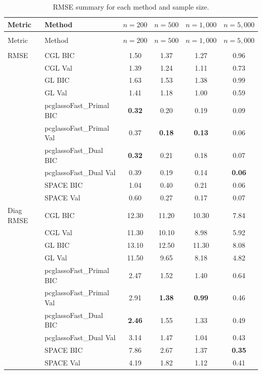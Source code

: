 \documentclass[12pt]{amsart}
\numberwithin{equation}{section}
\numberwithin{equation}{section}
\theoremstyle{plain}
\theoremstyle{definition}
\begin{document}
\begin{longtable}[]{@{}llcccc@{}}
\caption{RMSE summary for each method and sample size.\label{tab:hubrmse}}\\
\toprule\noalign{}
Metric & Method & $n=200$ & $n=500$ & $n=1,000$ & $n=5,000$ \\
\midrule\noalign{}
\endfirsthead

\multicolumn{6}{c}{{\tablename\ \thetable{} -- continued from previous page}} \\
\toprule\noalign{}
Metric & Method & $n=200$ & $n=500$ & $n=1,000$ & $n=5,000$ \\
\midrule\noalign{}
\endhead

\midrule \multicolumn{6}{r}{{Continued on next page}} \\
\endfoot

\bottomrule
\endlastfoot

RMSE & CGL BIC & 1.50 & 1.37 & 1.27 & 0.96 \\
 & CGL Val & 1.39 & 1.24 & 1.11 & 0.73 \\
 & GL BIC & 1.63 & 1.53 & 1.38 & 0.99 \\
 & GL Val & 1.41 & 1.18 & 1.00 & 0.59 \\
 & pcglassoFast\_Primal BIC & \textbf{0.32} & 0.20 & 0.19 & 0.09 \\
 & pcglassoFast\_Primal Val & 0.37 & \textbf{0.18} & \textbf{0.13} & 0.06 \\
 & pcglassoFast\_Dual BIC & \textbf{0.32} & 0.21 & 0.18 & 0.07 \\
 & pcglassoFast\_Dual Val & 0.39 & 0.19 & 0.14 & \textbf{0.06} \\
 & SPACE BIC & 1.04 & 0.40 & 0.21 & 0.06 \\
 & SPACE Val & 0.60 & 0.27 & 0.17 & 0.07 \\

\midrule\noalign{}
Diag RMSE & CGL BIC & 12.30 & 11.20 & 10.30 & 7.84 \\
 & CGL Val & 11.30 & 10.10 & 8.98 & 5.92 \\
 & GL BIC & 13.10 & 12.50 & 11.30 & 8.08 \\
 & GL Val & 11.50 & 9.65 & 8.18 & 4.82 \\
 & pcglassoFast\_Primal BIC & 2.47 & 1.52 & 1.40 & 0.64 \\
 & pcglassoFast\_Primal Val & 2.91 & \textbf{1.38} & \textbf{0.99} & 0.46 \\
 & pcglassoFast\_Dual BIC & \textbf{2.46} & 1.55 & 1.33 & 0.49 \\
 & pcglassoFast\_Dual Val & 3.14 & 1.47 & 1.04 & 0.43 \\
 & SPACE BIC & 7.86 & 2.67 & 1.37 & \textbf{0.35} \\
 & SPACE Val & 4.19 & 1.82 & 1.12 & 0.41 \\


\end{longtable}
\end{document}
